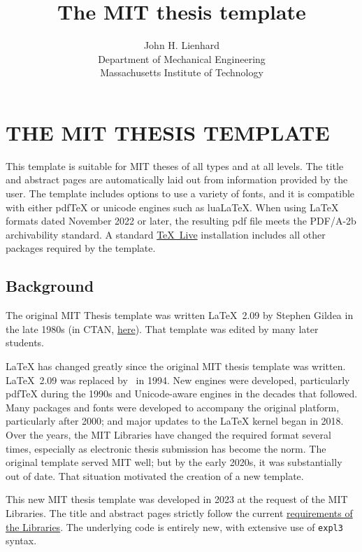 \documentclass[11pt]{article}
\title{The MIT thesis template}
\author{John H. Lienhard \\ Department of Mechanical Engineering \\ Massachusetts Institute of Technology}
\date{\daymonthyeardate}
\begin{document}
\maketitle

\section*{THE MIT THESIS TEMPLATE}

This template is suitable for MIT theses of all types and at all levels. The title and abstract pages are automatically laid out from information provided by the user. The template includes options to use a variety of fonts, and it is compatible with either pdfTeX or unicode engines such as luaLaTeX. When using LaTeX formats dated November 2022 or later, the resulting pdf file meets the PDF/A-2b archivability standard. A standard \href{https://www.tug.org/texlive/}{\TeX\ Live} installation includes all other packages required by the template.

\subsection*{Background}

The original MIT Thesis template was written \LaTeX\ 2.09 by Stephen Gildea in the late 1980s (in CTAN, \href{https://mirrors.ctan.org/obsolete/macros/latex209/contrib/mitthesis/mitthesis.sty}{here}). That template was edited by many later students.

LaTeX has changed greatly since the original MIT thesis template was written. \LaTeX\ 2.09 was replaced by \LaTeXe\ in 1994. New engines were developed, particularly pdfTeX during the 1990s and Unicode-aware engines in the decades that followed. Many packages and fonts were developed to accompany the original platform, particularly after 2000; and major updates to the LaTeX kernel began in 2018. Over the years, the MIT Libraries have changed the required format several times, especially as electronic thesis submission has become the norm. The original template served MIT well; but by the early 2020s, it was substantially out of date. That situation motivated the creation of a new template. 

This new MIT thesis template was developed in 2023 at the request of the MIT Libraries.  The title and abstract pages strictly follow the current \href{https://libraries.mit.edu/distinctive-collections/thesis-specs/}{requirements of the Libraries}. The underlying code is entirely new, with extensive use of  \texttt{expl3} syntax.
\end{document}
